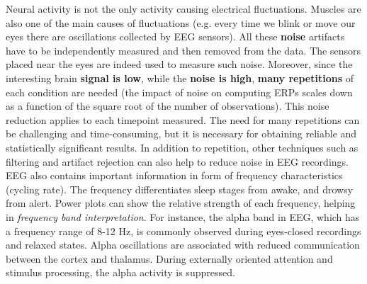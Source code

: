 
Neural activity is not the only activity causing electrical fluctuations. Muscles are also one of the main causes of fluctuations (e.g. every time we blink or move our eyes there are oscillations collected by EEG sensors). All these \textbf{noise} artifacts have to be independently measured and then removed from the data. The sensors placed near the eyes are indeed used to measure such noise.
Moreover, since the interesting brain \textbf{signal is low}, while the \textbf{noise is high}, \textbf{many repetitions} of each condition are needed (the impact of noise on computing ERPs scales down as a function of the square root of the number of observations). This noise reduction applies to each timepoint measured. 
The need for many repetitions can be challenging and time-consuming, but it is necessary for obtaining reliable and statistically significant results. In addition to repetition, other techniques such as filtering and artifact rejection can also help to reduce noise in EEG recordings.\\

EEG also contains important information in form of frequency characteristics (cycling rate). The frequency differentiates sleep stages from awake, and drowsy from alert.
Power plots can show the relative strength of each frequency, helping in \textit{frequency band interpretation}. For instance, the alpha band in EEG, which has a frequency range of 8-12 Hz, is commonly observed during eyes-closed recordings and relaxed states. Alpha oscillations are associated with reduced communication between the cortex and thalamus. During externally oriented attention and stimulus processing, the alpha activity is suppressed.


